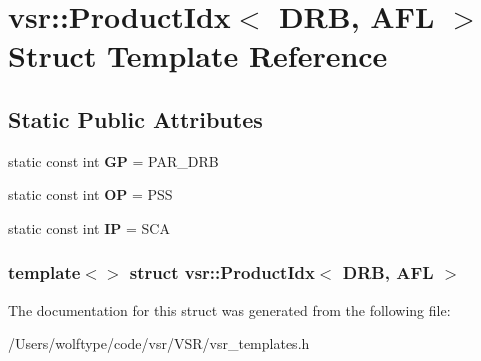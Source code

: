 \hypertarget{structvsr_1_1_product_idx_3_01_d_r_b_00_01_a_f_l_01_4}{\section{vsr\-:\-:Product\-Idx$<$ D\-R\-B, A\-F\-L $>$ Struct Template Reference}
\label{structvsr_1_1_product_idx_3_01_d_r_b_00_01_a_f_l_01_4}
}
\subsection*{Static Public Attributes}
\begin{DoxyCompactItemize}
\item 
\hypertarget{structvsr_1_1_product_idx_3_01_d_r_b_00_01_a_f_l_01_4_a637ab7a894872009ac628230bbb40992}{static const int {\bfseries G\-P} = P\-A\-R\-\_\-\-D\-R\-B}\label{structvsr_1_1_product_idx_3_01_d_r_b_00_01_a_f_l_01_4_a637ab7a894872009ac628230bbb40992}

\item 
\hypertarget{structvsr_1_1_product_idx_3_01_d_r_b_00_01_a_f_l_01_4_abde16bf642b57cefa38f102b1ce0cb75}{static const int {\bfseries O\-P} = P\-S\-S}\label{structvsr_1_1_product_idx_3_01_d_r_b_00_01_a_f_l_01_4_abde16bf642b57cefa38f102b1ce0cb75}

\item 
\hypertarget{structvsr_1_1_product_idx_3_01_d_r_b_00_01_a_f_l_01_4_aec390b0c0ca6fadadda81adec1eee269}{static const int {\bfseries I\-P} = S\-C\-A}\label{structvsr_1_1_product_idx_3_01_d_r_b_00_01_a_f_l_01_4_aec390b0c0ca6fadadda81adec1eee269}

\end{DoxyCompactItemize}
\subsubsection*{template$<$$>$ struct vsr\-::\-Product\-Idx$<$ D\-R\-B, A\-F\-L $>$}



The documentation for this struct was generated from the following file\-:\begin{DoxyCompactItemize}
\item 
/\-Users/wolftype/code/vsr/\-V\-S\-R/vsr\-\_\-templates.\-h\end{DoxyCompactItemize}
